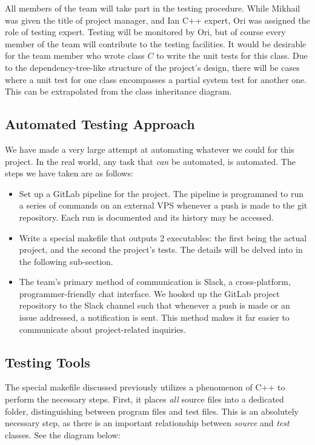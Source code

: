 \documentclass[12pt, titlepage]{article}
\begin{document}
	All members of the team will take part in the testing procedure. While Mikhail was given the title of project manager, and Ian C++ expert, Ori was assigned the role of testing expert. Testing will be monitored by Ori, but of course every member of the team will contribute to the testing facilities. It would be desirable for the team member who wrote class $C$ to write the unit tests for this class. Due to the dependency-tree-like structure of the project's design, there will be cases where a unit test for one class encompasses a partial system test for another one. This can be extrapolated from the class inheritance diagram.

	\subsection{Automated Testing Approach}

	We have made a very large attempt at automating whatever we could for this project. In the real world, any task that \textit{can} be automated, is automated. The steps we have taken are as follows:

	\begin{itemize}
		\item Set up a GitLab pipeline for the project. The pipeline is programmed to run a series of commands on an external VPS whenever a push is made to the git repository. Each run is documented and its history may be accessed.
		\item Write a special makefile that outputs 2 executables: the first being the actual project, and the second the project's tests. The details will be delved into in the following sub-section.
		\item The team's primary method of communication is Slack, a cross-platform, programmer-friendly chat interface. We hooked up the GitLab project repository to the Slack channel such that whenever a push is made or an issue addressed, a notification is sent. This method makes it far easier to communicate about project-related inquiries.
	\end{itemize}

	\subsection{Testing Tools}

	The special makefile discussed previously utilizes a phenomenon of C++ to perform the necessary steps. First, it places \textit{all} source files into a dedicated folder, distinguishing between program files and test files. This is an absolutely necessary step, as there is an important relationship between \textit{source} and \textit{test} classes. See the diagram below:
\end{document}
